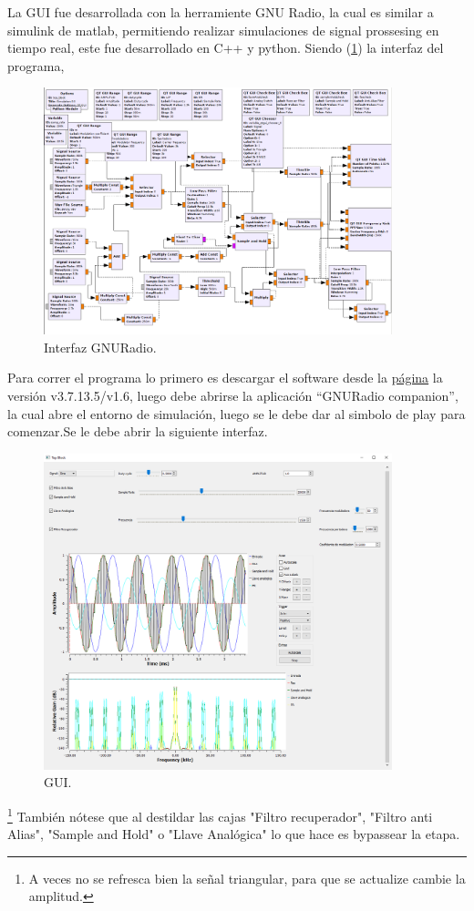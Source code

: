 %

%

La GUI fue desarrollada con la herramiente GNU Radio, la cual es similar a simulink de matlab, permitiendo realizar simulaciones de signal prossesing en tiempo real, este fue desarrollado en C++ y python.
Siendo (\ref{fig:gnu}) la interfaz del programa,
 \begin{figure}[H]
	\centering
	\includegraphics[width=0.9\textwidth]{ImagenesEjercicio5/gnuradio.PNG}
\caption{Interfaz GNURadio.}
	\label{fig:gnu}
\end{figure}
Para correr el programa lo primero es descargar el software desde la \href{http://www.gcndevelopment.com/gnuradio/downloads.htm}{página} la versión v3.7.13.5/v1.6, luego debe abrirse la aplicación ``GNURadio companion'', la cual abre el entorno de simulación, luego se le debe dar al simbolo de play para comenzar.Se le debe abrir la siguiente interfaz.
 \begin{figure}[H]
	\centering
	\includegraphics[width=0.9\textwidth]{ImagenesEjercicio5/gui.PNG}
\caption{GUI.}
	\label{fig:GUI}
\end{figure}
\footnote{A veces no se refresca bien la señal triangular, para que se actualize cambie la amplitud.}
También nótese que al destildar las cajas "Filtro recuperador", "Filtro anti Alias", "Sample and Hold" o "Llave Analógica" lo que hace es bypassear la etapa.
%